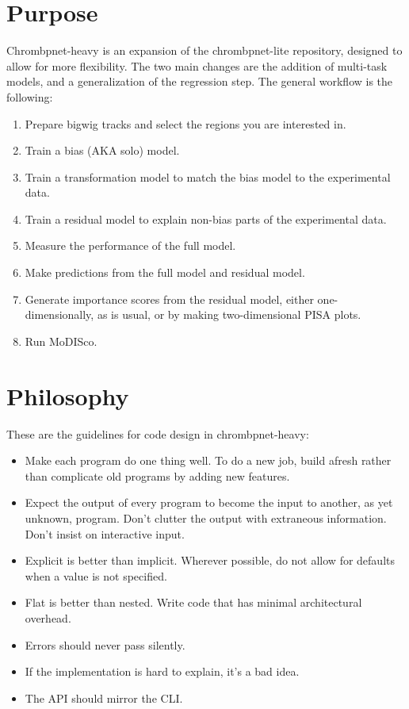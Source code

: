 \documentclass{article}
\begin{document}
\section{Purpose}
Chrombpnet-heavy is an expansion of the chrombpnet-lite repository, designed to allow for more flexibility. 
The two main changes are the addition of multi-task models, and a generalization of the regression step. 
The general workflow is the following:

\begin{enumerate}
    \item Prepare bigwig tracks and select the regions you are interested in. 
    \item Train a bias (AKA solo) model. 
    \item Train a transformation model to match the bias model to the experimental data. 
    \item Train a residual model to explain non-bias parts of the experimental data. 
    \item Measure the performance of the full model. 
    \item Make predictions from the full model and residual model.
    \item Generate importance scores from the residual model, either one-dimensionally, as is usual, or by making two-dimensional PISA plots. 
    \item Run MoDISco. 
\end{enumerate}

\section{Philosophy}
These are the guidelines for code design in chrombpnet-heavy:

\begin{itemize}
    \item Make each program do one thing well. To do a new job, build afresh rather than complicate old programs by adding new features.
    \item Expect the output of every program to become the input to another, as yet unknown, program. Don't clutter the output with extraneous information. Don't insist on interactive input. 
    \item Explicit is better than implicit. Wherever possible, do not allow for defaults when a value is not specified. 
    \item Flat is better than nested. Write code that has minimal architectural overhead. 
    \item Errors should never pass silently.
    \item If the implementation is hard to explain, it's a bad idea.
    \item The API should mirror the CLI. 
\end{itemize}
\end{document}
